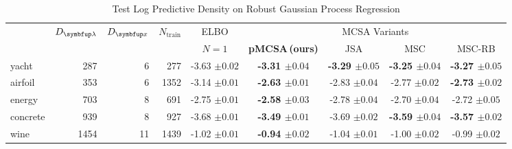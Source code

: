 
\begin{table*}
  \centering
  \caption{Test Log Predictive Density on Robust Gaussian Process Regression}\label{table:gp}
  \vspace{-0.05in}
  \setlength{\tabcolsep}{4pt}
  \begin{threeparttable}
  \begin{tabular}{lrrrccccc}
    \toprule
    & \multicolumn{1}{c}{\multirow{2}{*}{\footnotesize\(D_{\vlambda}\)}} & \multicolumn{1}{c}{\multirow{2}{*}{\(D_{\vx}\)}} &  \multicolumn{1}{c}{\multirow{2}{*}{\(N_{\text{train}}\)}} & \multicolumn{1}{c}{\multirow{1}{*}{ELBO}} & \multicolumn{4}{c}{MCSA Variants} \\\cmidrule(lr){5-5}\cmidrule(lr){6-9}
   & & & & \(N=1\) & \multicolumn{1}{c}{\multirow{1}{*}{\footnotesize\textbf{pMCSA{\scriptsize\,(ours)}}}} & \multicolumn{1}{c}{\multirow{1}{*}{\footnotesize{JSA}}} & \multicolumn{1}{c}{\multirow{1}{*}{\footnotesize{MSC}}} & \multicolumn{1}{c}{\multirow{1}{*}{\footnotesize{MSC-RB}}}\\
    \midrule
    \textsf{yacht} & 287 & 6 & 277 & {-3.63 {\scriptsize{\(\pm 0.02\)}}} & {\bf-3.31 {\scriptsize{\(\pm 0.04\)}}} & {\bf-3.29 {\scriptsize{\(\pm 0.05\)}}} & {\bf-3.25 {\scriptsize{\(\pm 0.04\)}}} & {\bf-3.27 {\scriptsize{\(\pm 0.05\)}}} \\
    \textsf{airfoil} & 353 & 6 & 1352 & {-3.14 {\scriptsize{\(\pm 0.01\)}}} & {\bf-2.63 {\scriptsize{\(\pm 0.01\)}}} & {-2.83 {\scriptsize{\(\pm 0.04\)}}} & {-2.77 {\scriptsize{\(\pm 0.02\)}}} & {\bf-2.73 {\scriptsize{\(\pm 0.02\)}}}\\
    \textsf{energy} & 703 & 8 & 691 & {-2.75 {\scriptsize{\(\pm 0.01\)}}} & {\bf-2.58 {\scriptsize{\(\pm 0.03\)}}} & {-2.78 {\scriptsize{\(\pm 0.04\)}}} & {-2.70 {\scriptsize{\(\pm 0.04\)}}} & {-2.72 {\scriptsize{\(\pm 0.05\)}}} \\
    \textsf{concrete} & 939 & 8 & 927 & {-3.68 {\scriptsize{\(\pm 0.01\)}}} & {\bf-3.49 {\scriptsize{\(\pm 0.01\)}}} & {-3.69 {\scriptsize{\(\pm 0.02\)}}} & {\bf-3.59 {\scriptsize{\(\pm 0.04\)}}} & {\bf-3.57 {\scriptsize{\(\pm 0.02\)}}} \\
    \textsf{wine} & 1454 & 11 & 1439 & {-1.02 {\scriptsize{\(\pm 0.01\)}}} & {\bf-0.94 {\scriptsize{\(\pm 0.02\)}}} & {-1.04 {\scriptsize{\(\pm 0.01\)}}} & {-1.00 {\scriptsize{\(\pm 0.02\)}}} & {-0.99 {\scriptsize{\(\pm 0.02\)}}} 

\end{tabular}
\end{threeparttable}
\end{table*}

